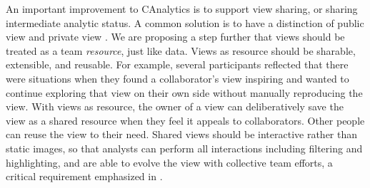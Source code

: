 An important improvement to CAnalytics is to support view sharing, or
sharing intermediate analytic status. A common solution is to have a
distinction of public view and private view \autocite{Convertino2011}.
We are proposing a step further that views should be treated as a team
\emph{resource}, just like data. Views as resource should be sharable,
extensible, and reusable. For example, several participants reflected
that there were situations when they found a collaborator's view
inspiring and wanted to continue exploring that view on their own side
without manually reproducing the view. With views as resource, the owner
of a view can deliberatively save the view as a shared resource when
they feel it appeals to collaborators. Other people can reuse the view
to their need. Shared views should be interactive rather than static
images, so that analysts can perform all interactions including
filtering and highlighting, and are able to evolve the view with
collective team efforts, a critical requirement emphasized in
\autocite{Carroll2013}.
